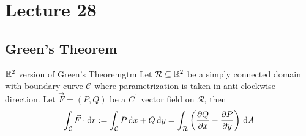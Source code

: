\documentclass[../Analysis-3.tex]{subfiles}
\begin{document}
\chapter*{Lecture 28} %
\setcounter{chapter}{28} %
\setcounter{section}{0}
\setcounter{equation}{0}
\setcounter{figure}{0}


\section{Green's Theorem}
\begin{Thm}{$\mathbb{R}^2$ version of Green's Theorem}{gtm}
  Let $\mathcal{R} \subseteq \mathbb{R}^2 $ be a simply connected domain with boundary curve $\mathcal{C}$ where parametrization is taken in anti-clockwise direction. Let $\vec{F} = (P,Q)$ be a $C^1$ vector field on $\mathcal{R}$, then
  \[
    \int_{\mathcal{C}} \vec{F} \cdot \dd r := \int_{\mathcal{C}} P \, \dd x + Q \, \dd y = \int_{\mathcal{R}} \left( \pdv{Q}{x} - \pdv{P}{y}\right) \, \dd A
  \]
\end{Thm}
\end{document}
